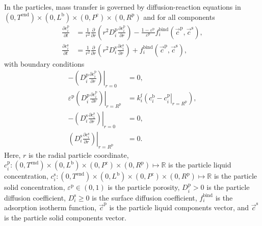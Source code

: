 \documentclass{article}
\begin{document}
In the particles, mass transfer is governed by diffusion-reaction equations in $(0, T^{\mathrm{end}}) \times (0, L^{\mathrm{b}})\times (0, P^{\mathrm{c}})\times (0, R^{\mathrm{p}})$ and for all components
\begin{align}
    \frac{\partial c^{\mathrm{p}}_{i}}{\partial t}
    &= \frac{1}{r^{2}} \frac{\partial }{\partial r} \left( r^{2} D^{\mathrm{p}}_{i} \frac{\partial c^{\mathrm{p}}_{i}}{\partial r} \right)
        - \frac{1 - \varepsilon^{\mathrm{p}}}{\varepsilon^{\mathrm{p}}}f^{\mathrm{bind}}_{i}\left( \vec{c}^{\mathrm{p}}, \vec{c}^{\mathrm{s}} \right),
    \\
    \frac{\partial c^{\mathrm{s}}_{i}}{\partial t}
    &= \frac{1}{r^{2}} \frac{\partial }{\partial r} \left( r^{2} D^{\mathrm{s}}_{i} \frac{\partial c^{\mathrm{s}}_{i}}{\partial r} \right)
        + f^{\mathrm{bind}}_{i}\left( \vec{c}^{\mathrm{p}}, \vec{c}^{\mathrm{s}} \right),
\end{align}
with boundary conditions
\begin{align}
    - \left. \left( D^{\mathrm{p}}_{i} \frac{\partial c^{\mathrm{p}}_{i}}{\partial r} \right) \right|_{r=0}
    &= 0,
    \\
    \varepsilon^{\mathrm{p}} \left. \left( D^{\mathrm{p}}_{i} \frac{\partial c^{\mathrm{p}}_{i}}{\partial r} \right)\right|_{r = R^{\mathrm{p}}}
    &= k^{\mathrm{f}}_{i} \left. \left( c^{\mathrm{b}}_{i} - c^{\mathrm{p}}_{i} \right|_{r = R^{\mathrm{p}}} \right),
    \\
    - \left( \left. D^{\mathrm{s}}_{i} \frac{\partial c^{\mathrm{s}}_{i}}{\partial r} \right) \right|_{r=0}
    &= 0,
    \\
    \left( \left. D^{\mathrm{s}}_{i} \frac{\partial c^{\mathrm{s}}_{i}}{\partial r} \right) \right|_{r = R^{\mathrm{p}}}
    &= 0.
\end{align}
Here, $r$ is the radial particle coordinate, $c^{\mathrm{p}}_{i}\colon (0, T^{\mathrm{end}}) \times (0, L^{\mathrm{b}})\times (0, P^{\mathrm{c}})\times (0, R^{\mathrm{p}}) \mapsto \mathbb{R}$ is the particle liquid concentration, $c^{\mathrm{s}}_{i}\colon (0, T^{\mathrm{end}}) \times (0, L^{\mathrm{b}})\times (0, P^{\mathrm{c}})\times (0, R^{\mathrm{p}}) \mapsto \mathbb{R}$ is the particle solid concentration, $\varepsilon^{\mathrm{p}}\in (0, 1)$ is the particle porosity, $D^{\mathrm{p}}_{i}> 0$ is the particle diffusion coefficient, $D^{\mathrm{s}}_{i}\geq 0$ is the surface diffusion coefficient, $f^{\mathrm{bind}}_{i}$ is the adsorption isotherm function, $\vec{c}^{\mathrm{p}}$ is the particle liquid components vector, and $\vec{c}^{\mathrm{s}}$ is the particle solid components vector.
\end{document}
